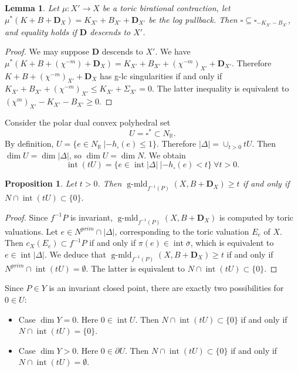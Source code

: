 \documentclass[12pt,twoside]{amsart}
\newcommand{\R}{{\mathbb R}}
\newcommand{\bD}{{\mathbf D}}
\newcommand{\Int}{\operatorname{int}}
\newcommand{\gmld}{\operatorname{g-mld}}
\theoremstyle{plain}
\newtheorem{lem}[thm]{Lemma}
\newtheorem{prop}[thm]{Proposition}
\theoremstyle{definition}
\theoremstyle{remark}
\begin{document}
\begin{lem}
	Let $\mu\colon X'\to X$ be a toric birational contraction, let
	$\mu^*(K+B+\bD_X)=K_{X'}+B_{X'}+\bD_{X'}$ be the log pullback.
	Then $\square\subseteq \square_{-K_{X'}-B_{X'}}$, and 
	equality holds if $\bD$ descends to $X'$.
\end{lem}

\begin{proof} We may suppose $\bD$ descends to $X'$.
	We have $\mu^*(K+B+(\chi^{-m})+\bD_X)=K_{X'}+B_{X'}+(\chi^{-m})_{X'}+\bD_{X'}$.
	Therefore $K+B+(\chi^{-m})_{X'}+\bD_X$ has g-lc singularities if and only if 
	$K_{X'}+B_{X'}+(\chi^{-m})_{X'}\le K_{X'}+\Sigma_{X'}=0$.
	The latter inequality is equivalent to $(\chi^m)_{X'}-K_{X'}-B_{X'}\ge 0$.
\end{proof}

Consider the polar dual convex polyhedral set 
$$
U=\square^*\subset N_\R.
$$ 
By definition, $U=\{e\in N_\R \ | -h_\square(e)\le 1 \}$.
Therefore $|\Delta|=\cup_{t>0}tU$. Then $\dim U=\dim |\Delta|$, so
$\dim U=\dim N$. We obtain
$$
\Int(tU)=\{e\in \Int |\Delta| \ | -h_\square(e)<t\} \ \forall t>0.
$$

\begin{prop}\label{mc}
	Let $t>0$. Then $\gmld_{f^{-1}(P)}(X,B+\bD_X)\ge t$ if and only if 
	$
	N\cap \Int(tU)\subset \{0\}.
	$
\end{prop}

\begin{proof} Since $f^{-1}P$ is invariant, $\gmld_{f^{-1}(P)}(X,B+\bD_X)$ is computed
	by toric valuations. Let $e\in N^{prim}\cap |\Delta|$, corresponding to the toric valuation $E_e$
	of $X$. Then $c_X(E_e)\subset f^{-1}P$ if and only if
	$\pi(e)\in \Int\bar{\sigma}$, which is equivalent to $e\in \Int |\Delta|$. We deduce that 
	$\gmld_{f^{-1}(P)}(X,B+\bD_X)\ge t$ if and only if $N^{prim}\cap \Int(tU)=\emptyset$.
	The latter is equivalent to $N\cap \Int(tU)\subset \{0\}$.
\end{proof}

Since $P\in Y$ is an invariant closed point, there are exactly two possibilities for $0\in U$:
\begin{itemize}
	\item[a)] Case $\dim Y=0$. Here $0\in \Int U$.
	Then $N\cap \Int(tU)\subset \{0\}$ if and only if $N\cap \Int(tU)= \{0\}$.
	\item[b)] Case $\dim Y>0$. Here $0\in \partial U$.
	Then $N\cap \Int(tU)\subset \{0\}$ if and only if $N\cap \Int(tU)= \emptyset$.
\end{itemize}
\end{document}
